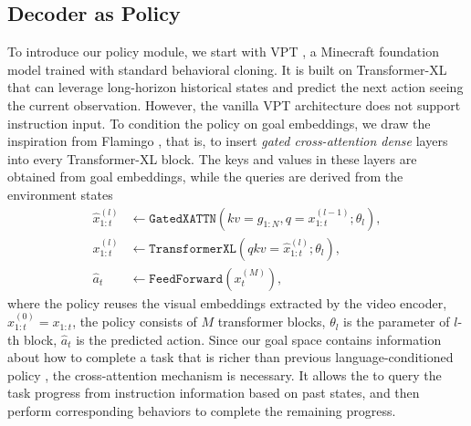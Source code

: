 \documentclass[11pt, a4paper, logo, one column]{craftjarvis}
\begin{document}
\subsection{Decoder as Policy}
To introduce our policy module, we start with VPT \citep{vpt}, a Minecraft foundation model trained with standard behavioral cloning. It is built on Transformer-XL \citep{transformerxl} that can leverage long-horizon historical states and predict the next action seeing the current observation. However, the vanilla VPT architecture does not support instruction input. To condition the policy on goal embeddings, we draw the inspiration from Flamingo \citep{flamingo}, that is, to insert \emph{gated cross-attention dense} layers into every Transformer-XL block. The keys and values in these layers are obtained from goal embeddings, while the queries are derived from the environment states
\begin{equation}\label{eq:decoder_as_policy}
\begin{aligned}
        \hat{x}^{(l)}_{1:t} &\leftarrow \texttt{GatedXATTN}(\textit{kv}=g_{1:N},\textit{q}=x^{(l-1)}_{1:t}; \theta_{l}), \\
    x^{(l)}_{1:t} &\leftarrow \texttt{TransformerXL}(\textit{qkv}=\hat{x}^{(l)}_{1:t}; \theta_{l}), \\
    \hat{a}_{t} &\leftarrow \texttt{FeedForward}(x^{(M)}_{t}),
\end{aligned}
\end{equation}
where the policy reuses the visual embeddings extracted by the video encoder, \ie $x^{(0)}_{1:t} = x_{1:t}$, the policy consists of $M$ transformer blocks, $\theta_{l}$ is the parameter of $l$-th block, $\hat{a}_t$ is the predicted action. 
Since our goal space contains information about how to complete a task that is richer than previous language-conditioned policy \citep{worldmc, steve1}, the cross-attention mechanism is necessary. It allows the \agent to query the task progress from instruction information based on past states, and then perform corresponding behaviors to complete the remaining progress. 
\end{document}
